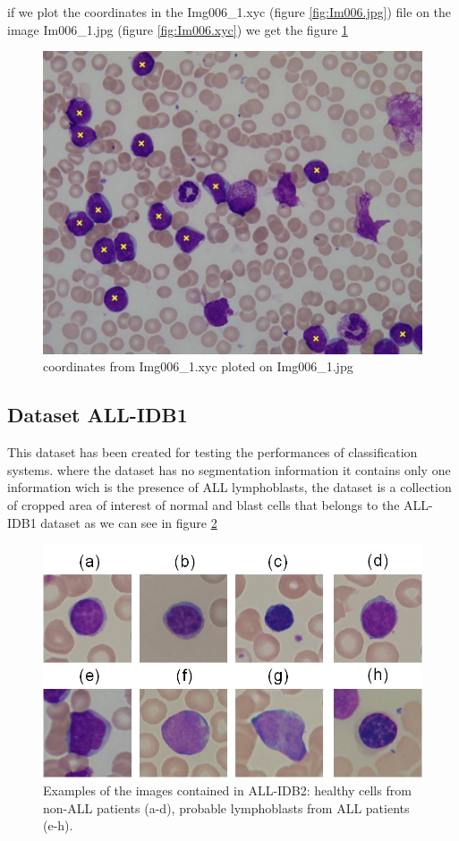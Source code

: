 if we plot the coordinates in the Img006\_1.xyc (figure \ref{fig:Im006.jpg}) file on the image Im006\_1.jpg (figure \ref{fig:Im006.xyc}) we get the figure \ref{fig:Im006.xyc.jpg}

\begin{figure}[H]
\centering
\includegraphics{../images/img006.xyc.jpg}
\caption{coordinates from Img006\_1.xyc ploted on Img006\_1.jpg}
\label{fig:Im006.xyc.jpg}
\end{figure}

\newpage

\subsection{Dataset ALL-IDB1}

This dataset has been created for testing the performances of classification systems. where the dataset has no segmentation information it contains only one information wich is the presence of ALL lymphoblasts, the dataset is a collection of cropped area of interest of normal and blast cells that belongs to the ALL-IDB1 dataset as we can see in figure \ref{fig:ALL-IDB2}


\begin{figure}[H]
\centering
\includegraphics{../images/ALL-IDB2.jpg}
\caption{Examples of the images contained in ALL-IDB2: healthy cells from non-ALL patients (a-d), probable lymphoblasts from ALL patients (e-h).}
\label{fig:ALL-IDB2}
\end{figure}


